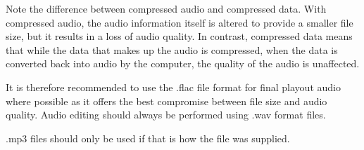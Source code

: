 \documentclass[../StudioOperationGuide.tex]{subfiles}
\begin{document}
Note the difference between compressed audio and compressed data. With
compressed audio, the audio information itself is altered to provide a
smaller file size, but it results in a loss of audio quality. In
contrast, compressed data means that while the data that makes up the
audio is compressed, when the data is converted back into audio by the
computer, the quality of the audio is unaffected.

It is therefore recommended to use the .flac file format for final
playout audio where possible as it offers the best compromise between
file size and audio quality. Audio editing should always be performed
using .wav format files.

.mp3 files should only be used if that is how the file was supplied.
\end{document}
